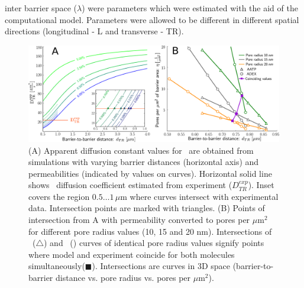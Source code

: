inter barrier space ($\lambda$) were parameters which were estimated with the aid of
the computational model. Parameters were allowed to be
different in different spatial directions (longitudinal - L and
transverse - TR). 
\begin{figure}[t!]
  \centering
    \includegraphics[width=12cm]{figures/mode_res.pdf}
    \caption[Computational model results]{(A) Apparent diffusion constant values for \ATP\
    are obtained from simulations with varying barrier distances
    (horizontal axis) and permeabilities (indicated by values on
    curves). Horizontal solid line shows \ATP\ diffusion
    coefficient estimated from experiment ($D^{exp}_{TR}$). Inset covers
    the region $0.5\ldots 1 \,\mu$m where curves intersect with
    experimental data. Intersection points are marked with triangles.
    (B) Points of intersection from A with permeability converted to
    pores per $\mu$m$^2$ for different pore radius
    values (10, 15 and 20 nm). Intersections of \ATP\ ($\triangle$) and
    \DEX\  (\protect \raisebox{-1pt}{\Large $\circ$}) curves of
    identical pore radius values signify points where model and
    experiment coincide for both molecules
    simultaneously($\blacksquare$). Intersections are curves in 3D space
    (barrier-to-barrier distance vs. pore radius vs. pores per {\small
    $\mu$}m$^2$).}
  \label{fig:model_res}
\end{figure}

